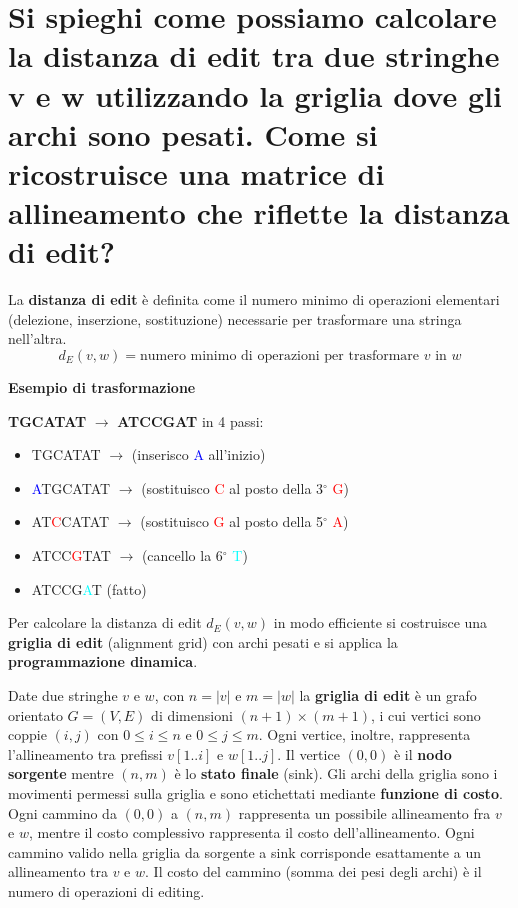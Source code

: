 \chapter{Si spieghi come possiamo calcolare la distanza di edit tra due stringhe v e w utilizzando la griglia dove gli archi sono pesati. Come si ricostruisce una matrice di allineamento che riflette la distanza di edit?}

La \textbf{distanza di edit} è definita come il numero minimo di operazioni elementari (delezione, inserzione, sostituzione) necessarie per trasformare una stringa nell'altra.
\begin{equation}
    d_E(v, w) = \text{numero minimo di operazioni per trasformare } v \text{ in } w
\end{equation}

\textbf{Esempio di trasformazione}

\textbf{TGCATAT} $\rightarrow$ \textbf{ATCCGAT} in 4 passi:
\begin{itemize}
  \item TGCATAT \quad $\rightarrow$ (inserisco \textcolor{blue}{A} all'inizio)
  \item \textcolor{blue}{A}TGCATAT \quad $\rightarrow$ (sostituisco \textcolor{red}{C} al posto della 3$^\circ$ \textcolor{red}{G})
  \item AT\textcolor{red}{C}CATAT \quad $\rightarrow$ (sostituisco \textcolor{red}{G} al posto della 5$^\circ$ \textcolor{red}{A})
  \item ATCC\textcolor{red}{G}TAT \quad $\rightarrow$ (cancello la 6$^\circ$ \textcolor{cyan}{T})
  \item ATCCG\textcolor{cyan}{A}T \quad (fatto)
\end{itemize}

Per calcolare la distanza di edit $d_E(v, w)$ in modo efficiente si costruisce una \textbf{griglia di edit} (alignment grid) con archi pesati e si applica la \textbf{programmazione dinamica}.

Date due stringhe $v$ e $w$, con $n=|v|$ e $m=|w|$ la \textbf{griglia di edit} è un grafo orientato $G=(V, E)$ di dimensioni 
$(n+1) \times (m+1)$, i cui vertici sono coppie $(i, j)$ con $0 \leq i \leq n$ e $0 \leq j \leq m$.
Ogni vertice, inoltre, rappresenta l'allineamento tra prefissi $v[1..i]$ e $w[1..j]$. 
Il vertice $(0,0)$ è il \textbf{nodo sorgente} mentre $(n,m)$ è lo \textbf{stato finale} (sink).
Gli archi della griglia sono i movimenti permessi sulla griglia e sono etichettati mediante \textbf{funzione di costo}.
Ogni cammino da $(0,0)$ a $(n,m)$ rappresenta un possibile allineamento fra $v$ e $w$, mentre il costo complessivo rappresenta il costo dell'allineamento.
Ogni cammino valido nella griglia da sorgente a sink corrisponde esattamente a un allineamento tra $v$ e $w$. Il costo del cammino (somma dei pesi degli archi) è il numero di operazioni di editing.

